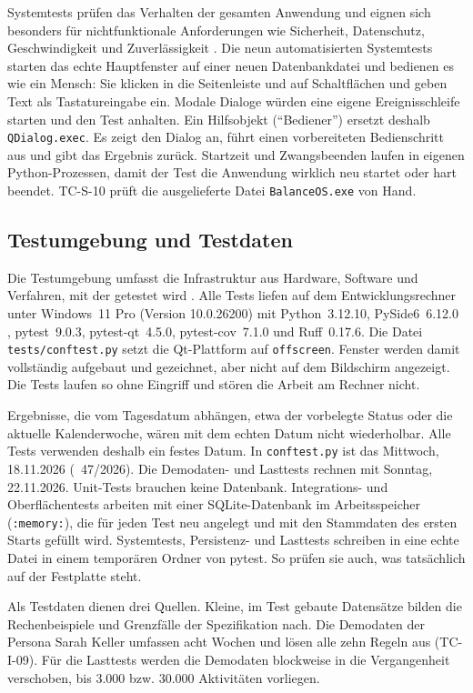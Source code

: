 Systemtests prüfen das Verhalten der gesamten Anwendung und eignen sich besonders für nichtfunktionale Anforderungen wie Sicherheit, Datenschutz, Geschwindigkeit und Zuverlässigkeit \parencite[S.~5-7]{swebok2026}. Die neun automatisierten Systemtests starten das echte Hauptfenster auf einer neuen Datenbankdatei und bedienen es wie ein Mensch: Sie klicken in die Seitenleiste und auf Schaltflächen und geben Text als Tastatureingabe ein. Modale Dialoge würden eine eigene Ereignisschleife starten und den Test anhalten. Ein Hilfsobjekt (\enquote{Bediener}) ersetzt deshalb \texttt{QDialog.exec}. Es zeigt den Dialog an, führt einen vorbereiteten Bedienschritt aus und gibt das Ergebnis zurück. Startzeit und Zwangsbeenden laufen in eigenen Python-Prozessen, damit der Test die Anwendung wirklich neu startet oder hart beendet. TC-S-10 prüft die ausgelieferte Datei \texttt{BalanceOS.exe} von Hand.

\subsection{Testumgebung und Testdaten}\label{sec:testumgebung}
Die Testumgebung umfasst die Infrastruktur aus Hardware, Software und Verfahren, mit der getestet wird \parencite[S.~5-21]{swebok2026}. Alle Tests liefen auf dem Entwicklungsrechner unter Windows~11 Pro (Version 10.0.26200) mit Python~3.12.10, PySide6~6.12.0 \parencite{pyside6}, pytest~9.0.3, pytest-qt~4.5.0, pytest-cov~7.1.0 und Ruff~0.17.6. Die Datei \texttt{tests/conftest.py} setzt die Qt-Plattform auf \texttt{offscreen}. Fenster werden damit vollständig aufgebaut und gezeichnet, aber nicht auf dem Bildschirm angezeigt. Die Tests laufen so ohne Eingriff und stören die Arbeit am Rechner nicht.

Ergebnisse, die vom Tagesdatum abhängen, etwa der vorbelegte Status oder die aktuelle Kalenderwoche, wären mit dem echten Datum nicht wiederholbar. Alle Tests verwenden deshalb ein festes Datum. In \texttt{conftest.py} ist das Mittwoch, 18.11.2026 (~47/2026). Die Demodaten- und Lasttests rechnen mit Sonntag, 22.11.2026. Unit-Tests brauchen keine Datenbank. Integrations- und Oberflächentests arbeiten mit einer SQLite-Datenbank im Arbeitsspeicher (\texttt{:memory:}), die für jeden Test neu angelegt und mit den Stammdaten des ersten Starts gefüllt wird. Systemtests, Persistenz- und Lasttests schreiben in eine echte Datei in einem temporären Ordner von pytest. So prüfen sie auch, was tatsächlich auf der Festplatte steht.

Als Testdaten dienen drei Quellen. Kleine, im Test gebaute Datensätze bilden die Rechenbeispiele und Grenzfälle der Spezifikation nach. Die Demodaten der Persona Sarah Keller umfassen acht Wochen und lösen alle zehn Regeln aus (TC-I-09). Für die Lasttests werden die Demodaten blockweise in die Vergangenheit verschoben, bis 3.000 bzw. 30.000 Aktivitäten vorliegen.

